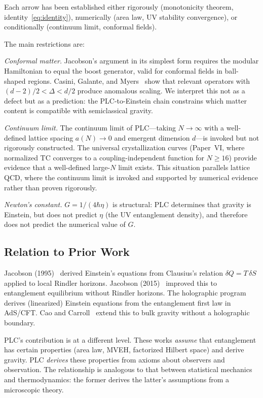 \documentclass[aps,pra,twocolumn,superscriptaddress,floatfix]{revtex4-2}
\begin{document}
Each arrow has been established either rigorously (monotonicity theorem, identity~\eqref{eq:identity}), numerically (area law, UV stability convergence), or conditionally (continuum limit, conformal fields).

The main restrictions are:

\emph{Conformal matter.}
Jacobson's argument in its simplest form requires the modular Hamiltonian to equal the boost generator, valid for conformal fields in ball-shaped regions.
Casini, Galante, and Myers~\cite{casini2016} show that relevant operators with $(d-2)/2 < \Delta < d/2$ produce anomalous scaling.
We interpret this not as a defect but as a prediction: the PLC-to-Einstein chain constrains which matter content is compatible with semiclassical gravity.

\emph{Continuum limit.}
The continuum limit of PLC---taking $N \to \infty$ with a well-defined lattice spacing $a(N) \to 0$ and emergent dimension $d$---is invoked but not rigorously constructed.
The universal crystallization curves (Paper~VI, where normalized TC converges to a coupling-independent function for $N \geq 16$) provide evidence that a well-defined large-$N$ limit exists.
This situation parallels lattice QCD, where the continuum limit is invoked and supported by numerical evidence rather than proven rigorously.

\emph{Newton's constant.}
$G = 1/(4\hbar\eta)$ is structural: PLC determines that gravity is Einstein, but does not predict $\eta$ (the UV entanglement density), and therefore does not predict the numerical value of $G$.

\subsection{Relation to Prior Work}

Jacobson (1995)~\cite{jacobson1995} derived Einstein's equations from Clausius's relation $\delta Q = T \, \delta S$ applied to local Rindler horizons.
Jacobson (2015)~\cite{jacobson2015} improved this to entanglement equilibrium without Rindler horizons.
The holographic program~\cite{faulkner2014,lashkari2014,swingle2014,vanraamsdonk2010} derives (linearized) Einstein equations from the entanglement first law in AdS/CFT.
Cao and Carroll~\cite{cao2018} extend this to bulk gravity without a holographic boundary.

PLC's contribution is at a different level.
These works \emph{assume} that entanglement has certain properties (area law, MVEH, factorized Hilbert space) and derive gravity.
PLC \emph{derives} these properties from axioms about observers and observation.
The relationship is analogous to that between statistical mechanics and thermodynamics: the former derives the latter's assumptions from a microscopic theory.
\end{document}
